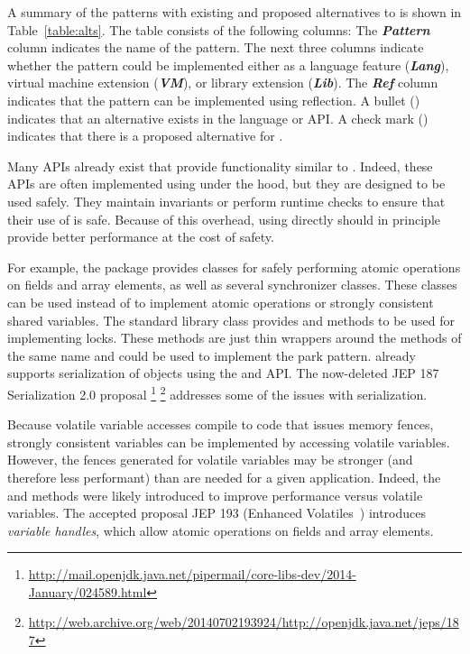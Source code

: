 

A summary of the patterns with existing and proposed alternatives to \unsafe{} is shown in Table~\ref{table:alts}.
The table consists of the following columns:
The \textbf{\em Pattern} column indicates the name of the pattern.
The next three columns indicate whether the pattern could be implemented either as a
language feature (\textbf{\em Lang}),
virtual machine extension (\textbf{\em VM}),
or
library extension (\textbf{\em Lib}).
The \textbf{\em Ref} column indicates that the pattern can be
implemented using reflection.
A bullet (\exis) indicates that an
alternative exists in the \java{} language or API. A check mark (\tick)
indicates that there is a proposed alternative for \java{}.

Many \java{} APIs already exist that provide functionality similar to \unsafe{}.
Indeed, these APIs are often implemented using \unsafe{} under the hood, but 
they are designed to be used safely.
They maintain invariants or perform runtime checks
to ensure that their use of \unsafe{} is safe.
Because of this overhead, using \unsafe{}
directly should in principle provide better performance at the cost of safety.

For example,
the  package provides classes 
for safely performing atomic operations on fields and array elements, as well
as several synchronizer classes. These
classes
can be used instead of \unsafe{} to implement
atomic operations or strongly consistent
shared variables.
The standard library class
 provides
 and 
methods to be used for implementing locks. 
These methods are just thin wrappers
around the \smu{} methods of the same name and 
could be used to implement the park pattern.
\java{} already supports serialization of objects using the
 and
 API.
The now-deleted JEP 187 Serialization 2.0 proposal%
\footnote{\url{http://mail.openjdk.java.net/pipermail/core-libs-dev/2014-January/024589.html}}
\footnote{\url{http://web.archive.org/web/20140702193924/http://openjdk.java.net/jeps/187}}
addresses some of the issues with \java{} serialization.

Because volatile variable accesses compile to code that issues memory fences, 
strongly consistent variables can be implemented by accessing volatile variables.
However, the fences generated for volatile variables may be stronger (and
therefore less performant) than are needed for a given application.
Indeed, the \unsafe{} 
and  methods were likely introduced
to improve performance versus volatile variables.
The accepted proposal JEP 193 (Enhanced Volatiles~\citep{jep193}) introduces \emph{variable handles}, which allow
atomic operations on fields and array elements.

